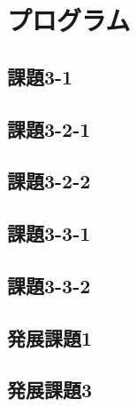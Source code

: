 \documentclass[titlepage, 10pt]{ltjsarticle}
\begin{document}
\section{プログラム}
\subsection{課題3-1}

\subsection{課題3-2-1}

\subsection{課題3-2-2}

\subsection{課題3-3-1}

\subsection{課題3-3-2}

\subsection{発展課題1}

\subsection{発展課題3}

\end{document}
